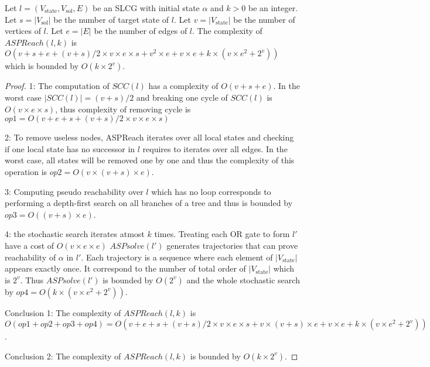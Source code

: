 \begin{theorem}
    Let $l=(V_{\mathrm{state}},V_{\mathrm{sol}}, E)$ be an SLCG with initial state $\alpha$ and $k > 0$ be an integer.
    Let $s=|V_{\mathrm{sol}}|$ be the number of target state of $l$.
    Let $v = |V_{\mathrm{state}}|$ be the number of vertices of $l$.
    Let $e=|E|$ be the number of edges of $l$.
    The complexity of $ASPReach(l,k)$ is $O(v + s + e + (v+s) / 2 \times v \times e \times s + v^{2} \times e + v \times e + k \times (v \times e^{2} + 2^{v}))$ which is bounded by $O(k \times 2^{v})$.
    \begin{proof}
    
        1: The computation of $SCC(l)$ has a complexity of $O(v + s + e)$.
        In the worst case $|SCC(l)| = (v+s) / 2$ and breaking one cycle of $SCC(l)$ is $O(v \times e \times s)$, thus complexity of removing cycle is $op1=O(v+ e + s + (v+s) / 2 \times v \times e \times s)$
        
        2: To remove useless nodes, ASPReach iterates over all local states and checking if one local state has no successor in $l$ requires to iterates over all edges.
        In the worst case, all states will be removed one by one and thus the complexity of this operation is $op2=O(v \times (v+s) \times e)$.
        
        3: Computing pseudo reachability over $l$ which has no loop corresponds to performing a depth-first search on all branches of a tree and thus is bounded by $op3=O((v+s) \times e)$.
        
        4: the stochastic search iterates atmost $k$ times.
        Treating each OR gate to form $l'$ have a cost of $O(v \times e \times e)$
        $ASPsolve(l')$ generates trajectories that can prove reachability of $\alpha$ in $l'$.
        Each trajectory is a sequence where each element of $|V_{\mathrm{state}}|$ appears exactly once.
        It correspond to the number of total order of $|V_{\mathrm{state}}|$ which is $2^{v}$.
        Thus $ASPsolve(l')$ is bounded by $O(2^{v})$ and the whole stochastic search by $op4=O(k \times (v \times e^{2} + 2^{v}))$.
        
        Conclusion 1: The complexity of $ASPReach(l,k)$ is $O(op1 + op2 + op3 + op4) = O(v + e + s + (v+s) / 2  \times v \times e \times s + v \times (v+s) \times e + v \times e + k \times (v \times e^{2} + 2^{v}))$.
        
        Conclusion 2: The complexity of $ASPReach(l,k)$ is bounded by $O(k \times 2^{v})$.
    \end{proof}
\end{theorem}

